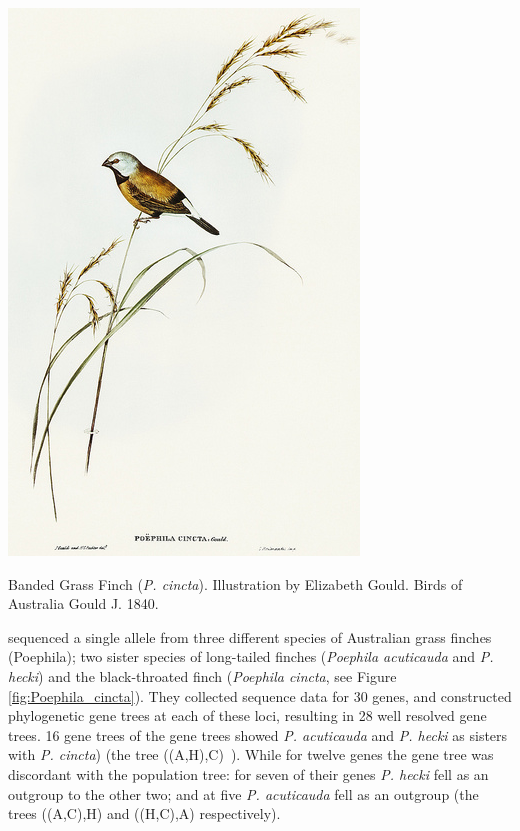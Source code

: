 \begin{marginfigure}
\begin{center}
\includegraphics[width=\textwidth]{illustration_images/Genetic_drift/Poephila_cincta_finch/Poephila_cincta_finch.png}
\end{center}
\caption{Banded Grass Finch ({\it P. cincta}). Illustration by
  Elizabeth Gould. Birds of Australia Gould J. 1840. } \label{fig:Poephila_cincta} 
\end{marginfigure}

\citeauthor{jennings:05} sequenced a single allele from three
different species of Australian grass finches (Poephila); two sister species
of long-tailed finches ({\it Poephila acuticauda} and {\it P. hecki})
and the black-throated finch ({\it Poephila cincta}, see Figure \ref{fig:Poephila_cincta}). They collected
sequence data for 30 genes, and constructed phylogenetic gene trees
at each of these loci, resulting in 28 well resolved gene trees. 
16 gene trees of the gene trees showed {\it
  P. acuticauda} and {\it P. hecki} as sisters with {\it P. cincta})
(the tree ((A,H),C)~). While for twelve genes the gene tree was
discordant with the population tree: for seven of their genes  {\it P. hecki}
fell as an outgroup to the other two; and at five {\it P. acuticauda} fell as an outgroup (the trees ((A,C),H) and
((H,C),A) respectively). 

